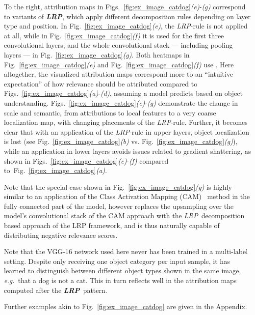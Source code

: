 \documentclass[conference]{IEEEtran}
\def\eg{\emph{e.g.~}}
\newcommand{\lrpalphabeta}[0]{\emph{LRP}}
\newcommand{\lrpflat}[0]{\emph{LRP}}
\newcommand{\lrpcnn}[0]{\emph{LRP}}
\newcommand{\LRPCMP}[0]{\textbf{\lrpcnn}}
\begin{document}
To the right, attribution maps in Figs.~\ref{fig:ex_image_catdog}\emph{(e)}-\emph{(g)} correspond to variants of \LRPCMP,
which apply different decomposition rules
depending on layer type and position.
In Fig.~\ref{fig:ex_image_catdog}\emph{(e)}, the \mbox{\lrpflat-rule} is
not applied at all,
while in Fig.~\ref{fig:ex_image_catdog}\emph{(f)} it is used for the first three convolutional layers, and the whole convolutional stack --- including pooling layers --- in Fig.~\ref{fig:ex_image_catdog}\emph{(g)}.
Both heatmaps in Fig.~\ref{fig:ex_image_catdog}\emph{(e)} and Fig.~\ref{fig:ex_image_catdog}\emph{(f)} use .
Here altogether, the visualized attribution maps correspond more to an ``intuitive expectation'' of how relevance should be attributed  compared to Figs.~\ref{fig:ex_image_catdog}\emph{(a)}-\emph{(d)}, assuming a model predicts based on object understanding.
\mbox{Figs.~\ref{fig:ex_image_catdog}\emph{(e)}-\emph{(g)}} demonstrate the change in scale and semantic, from attributions to local features to a very coarse localization map, with changing placements of the \mbox{\lrpflat-rule}.
Further, it becomes clear that with an application of the \lrpalphabeta-rule in upper layers, object localization is lost (see  Fig.~\ref{fig:ex_image_catdog}\emph{(b)} vs. Fig.~\ref{fig:ex_image_catdog}\emph{(g)}),
while an application in lower layers avoids issues related to gradient shattering,
as shown in Figs.~\ref{fig:ex_image_catdog}\emph{(e)}-\emph{(f)} compared to~Fig.~\ref{fig:ex_image_catdog}\emph{(a)}.

Note that the special case shown in Fig.~\ref{fig:ex_image_catdog}\emph{(g)} is highly similar
to an application of the Class Activation Mapping (CAM)~\cite{zhou2016learning} method in the fully connected part of the model,
however replaces the upsampling over the model's convolutional stack of the CAM approach with the \lrpflat~decomposition based approach of the LRP framework, and is thus naturally capable of distributing negative relevance scores.

Note that the VGG-16 network used here never has been trained in a multi-label setting.
Despite only receiving one object category per input sample, it has learned to distinguish between different object types shown in the same image,
\eg that a dog is not a cat.
This in turn reflects well in the attribution maps computed after the \LRPCMP~pattern.

Further examples akin to Fig.~\ref{fig:ex_image_catdog} are given in the Appendix.
\end{document}
